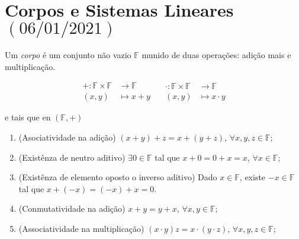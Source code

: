 \chapter{Corpos e Sistemas Lineares\quad$\left(06/01/2021\right)$}

\begin{definition}[Corpo]

	Um \emph{corpo} é um conjunto não vazio $\mathbb{F}$
	munido de duas operações: adição mais e multiplicação.

	\[
		\begin{aligned}
			+\colon\mathbb{F}\times\mathbb{F} & \longrightarrow\mathbb{F} \\
			\left(x,y\right)                  & \longmapsto x+y
		\end{aligned}\quad
		\begin{aligned}
			\cdot\colon\mathbb{F}\times\mathbb{F} & \longrightarrow\mathbb{F} \\
			\left(x,y\right)                      & \longmapsto x\cdot y
		\end{aligned}
	\]

	e tais que en $\left(\mathbb{F},+\right)$

	\begin{enumerate}[label={A\arabic*.},leftmargin=0em,itemindent=*]
		\item\label{adição:1}

		      (Asociatividade na adição)
		      $\left(x+y\right)+z=x+\left(y+z\right)$,
		      $\forall x,y,z\in\mathbb{F}$;

		\item\label{adição:2}

		      (Existênza de neutro aditivo)
		      $\exists0\in\mathbb{F}$ tal que $x+0=0+x=x$,
		      $\forall x\in\mathbb{F}$;

		\item\label{adição:3}

		      (Existênza de elemento oposto o inverso aditivo)
		      Dado $x\in\mathbb{F}$, existe $-x\in\mathbb{F}$ tal que
		      $x+\left(-x\right)=\left(-x\right)+x=0$.

		\item\label{adição:4}

		      (Conmutatividade na adição)
		      $x+y=y+x$, $\forall x,y\in\mathbb{F}$;

		\item\label{adição:5}

		      (Associatividade na multiplicação)
					$\left(x\cdot y\right)z=x\cdot\left(y\cdot z\right)$,
					$\forall x,y,z\in\mathbb{F}$;
	\end{enumerate}


\end{definition}
